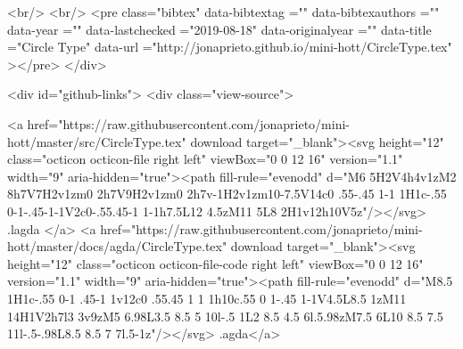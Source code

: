   <br/>
  <br/>
  <pre class="bibtex"
       data-bibtextag =""
       data-bibtexauthors =""
       data-year =""
       data-lastchecked ="2019-08-18"
       data-originalyear =""
       data-title ="Circle Type"
       data-url ="http://jonaprieto.github.io/mini-hott/CircleType.tex"
  ></pre>
  </div>
  

  <div id="github-links">
    <div class="view-source">
      
        <a href="https://raw.githubusercontent.com/jonaprieto/mini-hott/master/src/CircleType.tex" download target="_blank"><svg height="12" class="octicon octicon-file right left" viewBox="0 0 12 16" version="1.1" width="9" aria-hidden="true"><path fill-rule="evenodd" d="M6 5H2V4h4v1zM2 8h7V7H2v1zm0 2h7V9H2v1zm0 2h7v-1H2v1zm10-7.5V14c0 .55-.45 1-1 1H1c-.55 0-1-.45-1-1V2c0-.55.45-1 1-1h7.5L12 4.5zM11 5L8 2H1v12h10V5z"/></svg> .lagda </a>
        <a href="https://raw.githubusercontent.com/jonaprieto/mini-hott/master/docs/agda/CircleType.tex" download target="_blank"><svg height="12" class="octicon octicon-file-code right left" viewBox="0 0 12 16" version="1.1" width="9" aria-hidden="true"><path fill-rule="evenodd" d="M8.5 1H1c-.55 0-1 .45-1 1v12c0 .55.45 1 1 1h10c.55 0 1-.45 1-1V4.5L8.5 1zM11 14H1V2h7l3 3v9zM5 6.98L3.5 8.5 5 10l-.5 1L2 8.5 4.5 6l.5.98zM7.5 6L10 8.5 7.5 11l-.5-.98L8.5 8.5 7 7l.5-1z"/></svg> .agda</a>
      
